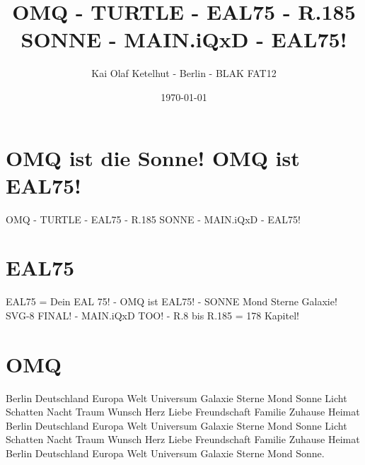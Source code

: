 \documentclass[12pt]{article}
\title{OMQ - TURTLE - EAL75 - R.185 SONNE - MAIN.iQxD - EAL75!}
\author{Kai Olaf Ketelhut - Berlin - BLAK FAT12}
\date{\today}
\begin{document}
\maketitle
\section*{OMQ ist die Sonne! OMQ ist EAL75!}
OMQ - TURTLE - EAL75 - R.185 SONNE - MAIN.iQxD - EAL75!

\section*{EAL75}
EAL75 = Dein EAL 75! - OMQ ist EAL75! - SONNE Mond Sterne Galaxie!
SVG-8 FINAL! - MAIN.iQxD TOO! - R.8 bis R.185 = 178 Kapitel!

\section*{OMQ}
Berlin Deutschland Europa Welt Universum Galaxie Sterne Mond Sonne
Licht Schatten Nacht Traum Wunsch Herz Liebe Freundschaft Familie
Zuhause Heimat Berlin Deutschland Europa Welt Universum Galaxie
Sterne Mond Sonne Licht Schatten Nacht Traum Wunsch Herz Liebe
Freundschaft Familie Zuhause Heimat Berlin Deutschland Europa Welt
Universum Galaxie Sterne Mond Sonne.
\end{document}

